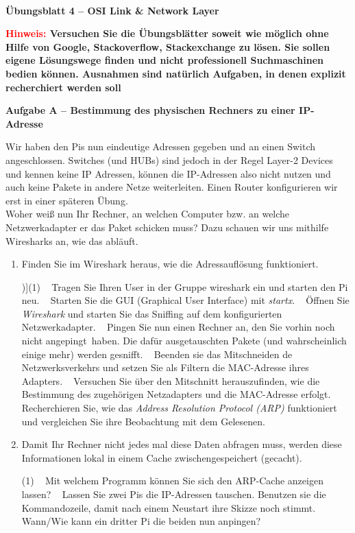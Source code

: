 \documentclass[paper=a4,fontsize=11pt]{scrartcl}%
\numberwithin{equation}{section}
\begin{document}
\begin{center}
~\\
\Large{\textbf{Übungsblatt 4 -- OSI Link \& Network Layer}}
\end{center}
\large{\textbf{\textcolor{red}{Hinweis:} Versuchen Sie die Übungsblätter soweit wie möglich ohne Hilfe von Google, Stackoverflow, Stackexchange zu lösen. Sie sollen eigene Lösungswege finden und nicht professionell Suchmaschinen bedien können. Ausnahmen sind natürlich Aufgaben, in denen explizit recherchiert werden soll}
\begin{center}\Large{\textbf{Aufgabe A -- Bestimmung des physischen Rechners zu einer IP-Adresse}}\end{center}\vskip0.25in
Wir haben den Pis nun eindeutige Adressen gegeben und an einen Switch angeschlossen. Switches (und HUBs) sind jedoch in der Regel Layer-2 Devices und kennen keine IP Adressen, können die IP-Adressen also nicht nutzen und auch keine Pakete in andere Netze weiterleiten. Einen Router konfigurieren wir erst in einer späteren Übung.\\
Woher weiß nun Ihr Rechner, an welchen Computer bzw. an welche Netzwerkadapter er das Paket schicken muss? Dazu schauen wir uns mithilfe Wiresharks an, wie das abläuft.

\begin{enumerate}
\item Finden Sie im Wireshark heraus, wie die Adressauflösung funktioniert.
\begin{tasks}[counter-format=(tsk[r])](1)
	\task~ Tragen Sie Ihren User in der Gruppe wireshark ein und starten den Pi neu.
	\task~ Starten Sie die GUI (Graphical User Interface) mit \emph{startx}.
	\task~ Öffnen Sie \emph{Wireshark} und starten Sie das Sniffing auf dem konfigurierten Netzwerkadapter.
	\task~ Pingen Sie nun einen Rechner an, den Sie vorhin noch nicht \glqq angepingt\grqq\ haben. Die dafür ausgetauschten Pakete (und wahrscheinlich einige mehr) werden \glqq gesnifft\grqq.
	\task~ Beenden sie das Mitschneiden de Netzwerksverkehrs und setzen Sie als Filtern die MAC-Adresse ihres Adapters.
	\task~ Versuchen Sie über den Mitschnitt herauszufinden, wie die Bestimmung des zugehörigen Netzadapters und die MAC-Adresse erfolgt.
	\task~ Recherchieren Sie, wie das \emph{Address Resolution Protocol (ARP)} funktioniert und vergleichen Sie ihre Beobachtung mit dem Gelesenen.
\end{tasks}
\item Damit Ihr Rechner nicht jedes mal diese Daten abfragen muss, werden diese Informationen lokal in einem Cache zwischengespeichert (\glqq gecacht\grqq).
\begin{tasks}(1)
	\task~ Mit welchem Programm können Sie sich den ARP-Cache anzeigen lassen?
	\task~ Lassen Sie zwei Pis die IP-Adressen tauschen. Benutzen sie die Kommandozeile, damit nach einem Neustart ihre Skizze noch stimmt. Wann/Wie kann ein dritter Pi die beiden nun \glqq anpingen\grqq?
\end{tasks}
\end{enumerate}	

}
\end{document}

